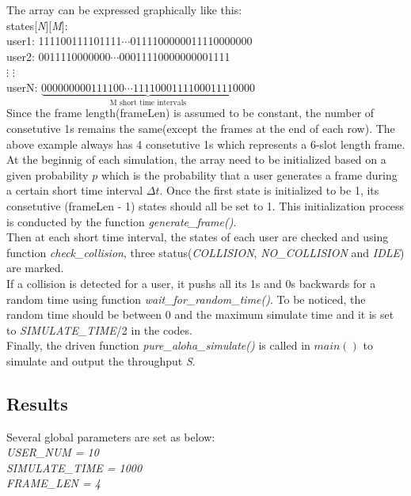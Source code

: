 \documentclass[11pt,a4paper]{report}
\begin{document}
The array can be expressed graphically like this: \\

states[\emph{N}][\emph{M}]: \\

\qquad user1: 111100111101111\(\cdots\)0111100000011110000000 \\

\qquad user2: 0011110000000\(\cdots\)00011110000000001111 \\

\qquad\quad \(\vdots\) \hspace{35mm} \(\vdots\) \\

\qquad userN: \hspace{-0.5mm}\(\underbrace{000000000111100\cdots1111000111100011110000}_\text{M short time intervals}\) \\

Since the frame length(frameLen) is assumed to be constant, the number of consetutive 1s remains the same(except the frames at the end of each row). The above example always has 4 consetutive 1s which represents a 6-slot length frame. \\

At the beginnig of each simulation, the array need to be initialized based on a given probability \(p\) which is the probability that a user generates a frame during a certain short time interval \(\Delta t\). Once the first state is initialized to be 1, its consetutive (frameLen - 1) states should all be set to 1. This initialization process is conducted by the function \emph{generate\_frame()}.\\

Then at each short time interval, the states of each user are checked and using function \emph{check\_collision}, three status(\emph{COLLISION}, \emph{NO\_COLLISION} and \emph{IDLE}) are marked. \\

If a collision is detected for a user, it pushs all its 1s and 0s backwards for a random time using function \emph{wait\_for\_random\_time()}. To be noticed, the random time should be between 0 and the maximum simulate time and it is set to \emph{SIMULATE\_TIME}/2 in the codes. \\

Finally, the driven function \emph{pure\_aloha\_simulate()} is called in \(main()\) to simulate and output the throughput \emph{S}.


\subsection*{Results}
Several global parameters are set as below: \\
\emph{USER\_NUM = 10} \\
\emph{SIMULATE\_TIME = 1000} \\
\emph{FRAME\_LEN = 4} \\
\end{document}
